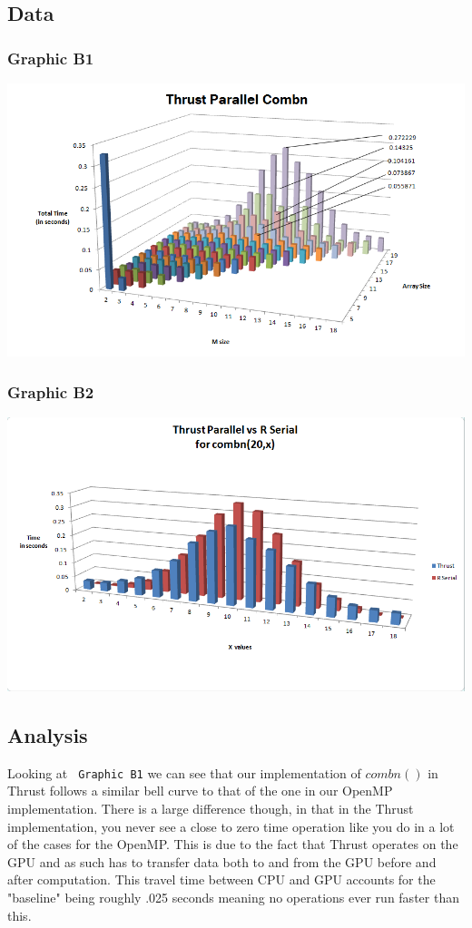\documentclass[titlepage, 11pt]{article}
\begin{document}
\subsection{Data}
\subsubsection{Graphic B1}
\includegraphics[scale = 0.5]{images/3D-Thrust.png} \\
\subsubsection{Graphic B2}
\includegraphics[scale = 0.5]{images/ThrustvsR.png}

\subsection{Analysis}
Looking at \verb; Graphic B1; we can see that our implementation of $combn()$ in Thrust follows a similar bell curve to that of the one in our OpenMP implementation. There is a large difference though, in that in the Thrust implementation, you never see a close to zero time operation like you do in a lot of the cases for the OpenMP. This is due to the fact that Thrust operates on the GPU and as such has to transfer data both to and from the GPU before and after computation. This travel time between CPU and GPU accounts for the "baseline" being roughly .025 seconds meaning no operations ever run faster than this.
\end{document}

